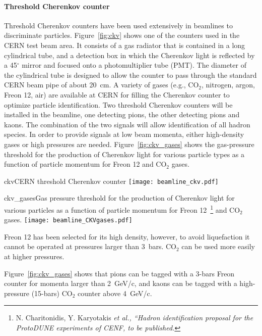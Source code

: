 \paragraph{Threshold Cherenkov counter}
Threshold Cherenkov counters have been used extensively in beamlines to discriminate particles. Figure~\ref{fig:ckv} shows one of the counters used in the CERN test beam area. It consists of a gas radiator that is contained in a long cylindrical tube, and a detection box in which the Cherenkov light is reflected by a 45$^\circ$ mirror and focused onto a photomultiplier tube (PMT). The diameter of the cylindrical tube is designed to allow the counter to pass through the standard CERN beam pipe of about 20~cm. A variety of gases (e.g., CO$_2$, nitrogen, argon, Freon 12, air) are available at CERN for filling the Cherenkov counter to optimize particle identification. 
Two threshold Cherenkov counters will be installed in the beamline, one detecting pions, the other detecting pions 
and kaons. The combination of the two signals will allow identification of all hadron species. In order to provide signals at low beam momenta, either high-density gases or high pressures are needed.
Figure~\ref{fig:ckv_gases} shows the gas-pressure threshold 
for the production of Cherenkov light for various particle types as a function of particle momentum for Freon 12 and CO$_2$ gases.
\begin{cdrfigure}{ckv}{CERN threshold Cherenkov counter}
  \texttt{[image: beamline\_ckv.pdf]}
\end{cdrfigure}
\begin{cdrfigure}{ckv_gases}{Gas pressure threshold for the production of Cherenkov light for various particles as a function of particle momentum for Freon 12~\footnote{N. Charitonidis, Y. Karyotakis \it{et al.}, ``Hadron identification proposal for the ProtoDUNE experiments of CENF, to be published.} and CO$_2$ gases.}
  \texttt{[image: beamline\_CKVgases.pdf]}
\end{cdrfigure}
Freon 12 has been selected for its high density, however,  to avoid liquefaction it cannot be operated at pressures larger than 3~bars.  CO$_2$ can be used more easily at higher pressures.  

 Figure~\ref{fig:ckv_gases} shows that pions can be tagged with a 3-bars Freon counter for momenta larger than 2~GeV/c, and kaons can be tagged with a high-pressure  (15-bars) CO$_2$  counter above 4~GeV/c.

